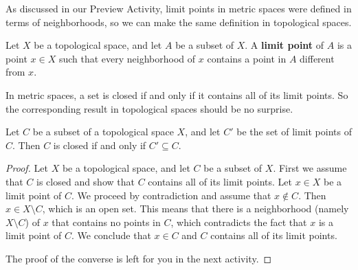 


\label{sec_limit_closure}

As discussed in our Preview Activity, limit points in metric spaces were defined in terms of neighborhoods, so we can make the same definition in topological spaces. 



\begin{definition} Let $X$ be a topological space, and let $A$ be a subset of $X$. A \textbf{limit point} of $A$ is a point $x \in X$ such that every neighborhood of $x$ contains a point in $A$ different from $x$. 
\end{definition}



In metric spaces, a set is closed if and only if it contains all of its limit points. So the corresponding result in topological spaces should be no surprise. 



\begin{theorem} \label{thm:TS_closed_limitpoints} Let $C$ be a subset of a topological space $X$, and let $C'$ be the set of limit points of $C$. Then $C$ is closed if and only if $C' \subseteq C$.  
\end{theorem}

\begin{proof} Let $X$ be a topological space, and let $C$ be a subset of $X$. First we assume that $C$ is closed and show that $C$ contains all of its limit points. Let $x \in X$ be a limit point of $C$. We proceed by contradiction and assume that $x \notin C$. Then $x \in X \setminus C$, which is an open set. This means that there is a neighborhood (namely $X \setminus C$) of $x$ that contains no points in $C$, which contradicts the fact that $x$ is a limit point of $C$. We conclude that $x \in C$ and $C$ contains all of its limit points.

The proof of the converse is left for you in the next activity. 
\end{proof}



